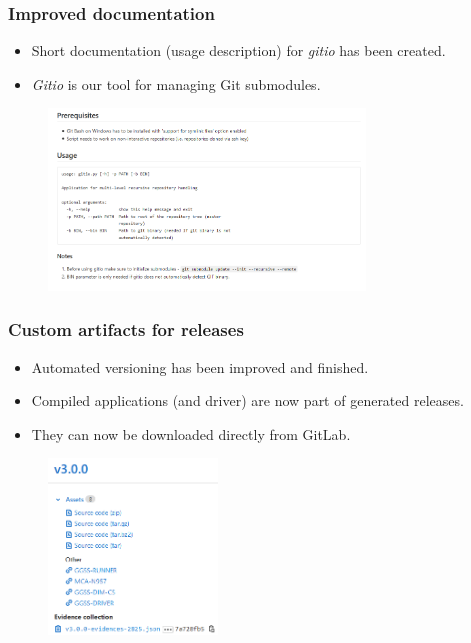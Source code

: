 \documentclass[10pt]{beamer}
\begin{document}
\begin{frame}
\frametitle{Improved documentation}
\begin{itemize}
    \item Short documentation (usage description) for \emph{gitio} has been created.
    \item \emph{Gitio} is our tool for managing Git submodules.
\end{itemize}
\begin{figure}
    \centering 
    \includegraphics[width=0.75\textwidth]{static/gitio_documentation.PNG}
\end{figure}
\end{frame}

\begin{frame}
\frametitle{Custom artifacts for releases}
\begin{itemize}
    \item Automated versioning has been improved and finished. 
    \item Compiled applications (and driver) are now part of generated releases.
    \item They can now be downloaded directly from GitLab.
\end{itemize}
\begin{figure}
    \centering 
    \includegraphics[width=0.4\textwidth]{static/artifacts.png}
\end{figure}
\end{frame}
\end{document}
